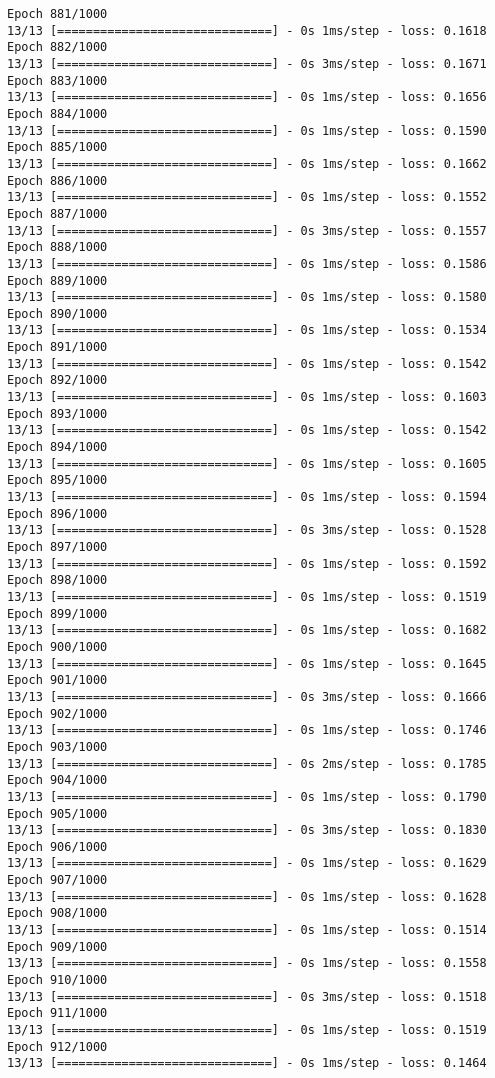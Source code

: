 \documentclass[11pt]{article}
\begin{document}
\begin{Verbatim}[commandchars=\\\{\}]
Epoch 881/1000
13/13 [==============================] - 0s 1ms/step - loss: 0.1618
Epoch 882/1000
13/13 [==============================] - 0s 3ms/step - loss: 0.1671
Epoch 883/1000
13/13 [==============================] - 0s 1ms/step - loss: 0.1656
Epoch 884/1000
13/13 [==============================] - 0s 1ms/step - loss: 0.1590
Epoch 885/1000
13/13 [==============================] - 0s 1ms/step - loss: 0.1662
Epoch 886/1000
13/13 [==============================] - 0s 1ms/step - loss: 0.1552
Epoch 887/1000
13/13 [==============================] - 0s 3ms/step - loss: 0.1557
Epoch 888/1000
13/13 [==============================] - 0s 1ms/step - loss: 0.1586
Epoch 889/1000
13/13 [==============================] - 0s 1ms/step - loss: 0.1580
Epoch 890/1000
13/13 [==============================] - 0s 1ms/step - loss: 0.1534
Epoch 891/1000
13/13 [==============================] - 0s 1ms/step - loss: 0.1542
Epoch 892/1000
13/13 [==============================] - 0s 1ms/step - loss: 0.1603
Epoch 893/1000
13/13 [==============================] - 0s 1ms/step - loss: 0.1542
Epoch 894/1000
13/13 [==============================] - 0s 1ms/step - loss: 0.1605
Epoch 895/1000
13/13 [==============================] - 0s 1ms/step - loss: 0.1594
Epoch 896/1000
13/13 [==============================] - 0s 3ms/step - loss: 0.1528
Epoch 897/1000
13/13 [==============================] - 0s 1ms/step - loss: 0.1592
Epoch 898/1000
13/13 [==============================] - 0s 1ms/step - loss: 0.1519
Epoch 899/1000
13/13 [==============================] - 0s 1ms/step - loss: 0.1682
Epoch 900/1000
13/13 [==============================] - 0s 1ms/step - loss: 0.1645
Epoch 901/1000
13/13 [==============================] - 0s 3ms/step - loss: 0.1666
Epoch 902/1000
13/13 [==============================] - 0s 1ms/step - loss: 0.1746
Epoch 903/1000
13/13 [==============================] - 0s 2ms/step - loss: 0.1785
Epoch 904/1000
13/13 [==============================] - 0s 1ms/step - loss: 0.1790
Epoch 905/1000
13/13 [==============================] - 0s 3ms/step - loss: 0.1830
Epoch 906/1000
13/13 [==============================] - 0s 1ms/step - loss: 0.1629
Epoch 907/1000
13/13 [==============================] - 0s 1ms/step - loss: 0.1628
Epoch 908/1000
13/13 [==============================] - 0s 1ms/step - loss: 0.1514
Epoch 909/1000
13/13 [==============================] - 0s 1ms/step - loss: 0.1558
Epoch 910/1000
13/13 [==============================] - 0s 3ms/step - loss: 0.1518
Epoch 911/1000
13/13 [==============================] - 0s 1ms/step - loss: 0.1519
Epoch 912/1000
13/13 [==============================] - 0s 1ms/step - loss: 0.1464

\end{Verbatim}
\end{document}
